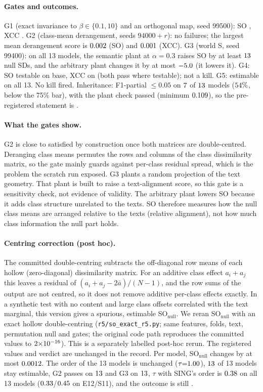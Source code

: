 \documentclass[10pt]{article}
\begin{document}
\paragraph{Gates and outcomes.} G1 (exact invariance to $\beta\in\{0.1,10\}$ and an orthogonal map, seed 99500): SO \FSOGOne, XCC \FXCCGOne. G2 (class-mean derangement, seeds $94000{+}r$): no failures; the largest mean derangement score is $0.002$ (SO) and $0.001$ (XCC). G3 (world S, seed 99400): on all 13 models, the semantic plant at $\alpha{=}0.3$ raises SO by at least $13$ null SDs, and the arbitrary plant changes it by at most $-5.0$ (it lowers it). G4: SO testable on \FSOGFourTestable{} base, XCC on \FXCCGFourTestable{} (both pass where testable); not a kill. G5: estimable on all 13. No kill fired. Inheritance: F1-partial $\le0.05$ on $7$ of $13$ models ($54\%$, below the 75\% bar), with the plant check passed (minimum $0.109$), so the pre-registered statement is \FInhStatement.

\paragraph{What the gates show.} G2 is close to satisfied by construction once both matrices are double-centred. Deranging class means permutes the rows and columns of the class dissimilarity matrix, so the gate mainly guards against per-class residual spread, which is the problem the scratch run exposed. G3 plants a random projection of the text geometry. That plant is built to raise a text-alignment score, so this gate is a sensitivity check, not evidence of validity. The arbitrary plant lowers SO because it adds class structure unrelated to the texts. SO therefore measures how the null class means are arranged relative to the texts (relative alignment), not how much class information the null part holds.

\paragraph{Centring correction (post hoc).} The committed double-centring subtracts the off-diagonal row means of each hollow (zero-diagonal) dissimilarity matrix. For an additive class effect $a_i{+}a_j$ this leaves a residual of $(a_i{+}a_j{-}2\bar a)/(N{-}1)$, and the row sums of the output are not centred, so it does not remove additive per-class effects exactly. In a synthetic test with no content and large class offsets correlated with the text marginal, this version gives a spurious, estimable SO$_{\mathrm{null}}$. We reran SO$_{\mathrm{null}}$ with an exact hollow double-centring (\texttt{r5/so\_exact\_r5.py}; same features, folds, text, permutation null and gates; the original code path reproduces the committed values to $2{\times}10^{-16}$). This is a separately labelled post-hoc rerun. The registered values and verdict are unchanged in the record. Per model, SO$_{\mathrm{null}}$ changes by at most $0.0012$. The order of the 13 models is unchanged ($\tau{=}1.00$), $13$ of 13 models stay estimable, G2 passes on $13$ and G3 on $13$, $\tau$ with SING's order is $0.38$ on all 13 models ($0.33$/$0.45$ on E12/S11), and the outcome is still \RPSOLabel.
\end{document}

